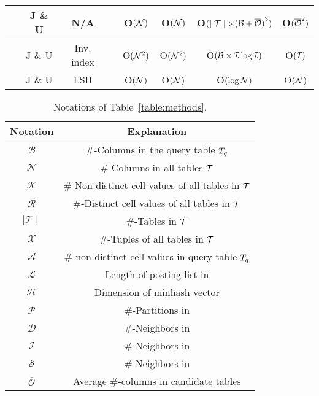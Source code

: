 \begin{table*}[t]
\begin{tabular}{|c|c|c|c|cccc|}
		\hline
		\frt~\cite{Frt12} & J \& U & N/A & \XSolidBrush &  O$(\mathcal{N})$        & O$(\mathcal{N})$    & O$( \mid \mathcal{T} \mid \times {(\mathcal{B}+ \overline{\mathcal{O}})}^3)$               & O$({\overline{\mathcal{O}}}^2)$    \\
		\hline
		\infogather~\cite{InfoGather} & J \& U & Inv. index & \XSolidBrush & O$(\mathcal{N}^2)$   & O$(\mathcal{N}^2)$    & O$(\mathcal{B} \times \mathcal{I} \log \mathcal{I})$              & O$(\mathcal{I} )$   \\
		\hline
		\cc{\aurum~\cite{Aurum}} & J \& U & LSH & \Checkmark  & O$(\mathcal{N})$         & O$(\mathcal{N})$                   & O$(\log \mathcal{N})$                & O$(\mathcal{N})$   \\
		\hline
		
		
	\end{tabular}
	\label{table:methods}
	
\end{table*}

\begin{table}[!ht]
	\centering
	\caption{ Notations of Table~\ref{table:methods}.}
	\begin{tabular}{|c|c|}
		\hline
		Notation & Explanation \\ \hline
		$\mathcal{B}$ & \#-Columns in the query table $T_q$  \\\hline
		$\mathcal{N}$ &\#-Columns in all tables $\mathcal{T}$ \\\hline
		$\mathcal{K}$ & \#-Non-distinct cell values of all tables in $\mathcal{T}$   \\\hline
		$\mathcal{R}$ &\#-Distinct cell values of all tables in $\mathcal{T}$ \\\hline
		$\mid \mathcal{T} \mid$ & \#-Tables in $\mathcal{T}$  \\\hline
		$\mathcal{X}$ &\#-Tuples of all tables in $\mathcal{T}$ \\\hline
		$\mathcal{A}$ & \#-non-distinct cell values in query table $T_q$  \\\hline
		
		$\mathcal{L}$ & Length of posting list in \josie  \\\hline
		
		$\mathcal{H}$ & Dimension of minhash vector \\\hline
		$\mathcal{P}$ & \#-Partitions in \lsh\\\hline
		$\mathcal{D}$ & \#-Neighbors in \dlll\\\hline
		$\mathcal{I}$ & \#-Neighbors in \infogather\\\hline
		$\mathcal{S}$ & \#-Neighbors in \santos\\\hline
		$\overline{\mathcal{O}}$ & Average  \#-columns in candidate tables
		\\ \hline
		
		
		
	\end{tabular}
	\label{symbol_table}
\end{table}

